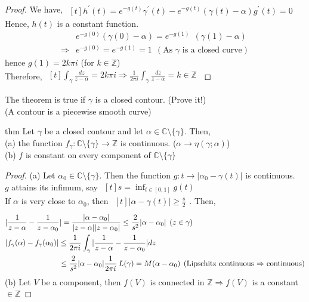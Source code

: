 \begin{proof}
We have, $\begin{aligned}[t] h^{'}(t)=e^{-g(t)}\gamma^{'}(t)-e^{-g(t)}(\gamma(t)-\alpha)g^{'}(t)=0\end{aligned}$\\
Hence, $h(t)$ is a constant function.
\begin{align}
&e^{-g(0)}(\gamma(0)-\alpha)=e^{-g(1)}\:\:(\gamma(1)-\alpha)\nonumber \\
\Rightarrow &e^{-g(0)}=e^{-g(1)}=1 \:\:(\text{As $\gamma$ is a closed curve})\nonumber
\end{align}
hence $g(1)=2k\pi i$ (for $k\in \mathds{Z}$)\\
Therefore, $\begin{aligned}[t] \int_{\gamma}^{}\frac{dz}{z-\alpha}=2k\pi i\Rightarrow \frac{1}{2\pi i}\int_{\gamma}^{}\frac{dz}{z-\alpha}=k\in \mathds{Z} \end{aligned}$ 
\end{proof}
\begin{rem}
The theorem is true if $\gamma$ is a closed contour. (Prove it!) \\(A contour is a piecewise smooth curve)\\
\end{rem}
\begin{restatable}[]{thm}{}\label{}
Let $\gamma$ be a closed contour and let $\alpha \in \mathds{C}\setminus \{\gamma\}$. Then,\\
(a) the function $f_{\gamma}: \mathds{C}\setminus \{\gamma\}\rightarrow \mathds{Z}$ is continuous. ($\alpha \rightarrow \eta(\gamma;\alpha)$)\\
(b) $f$ is constant on every component of $\mathds{C}\setminus \{\gamma\}$
\end{restatable}
\begin{proof}
(a) Let $\alpha_0 \in \mathds{C}\setminus \{\gamma\}$. Then the function $g:t \rightarrow |\alpha_0-\gamma(t)|$ is continuous.\\
$g$ attains its infimum, say $\begin{aligned}[t] s=\inf_{t\in[0,1]} g(t)\end{aligned}$\\
If $\alpha$ is very close to $\alpha_0$, then $\begin{aligned}[t]|\alpha-\gamma(t)|\geq \frac{s}{2}\end{aligned}$. Then,
\begin{align}
&|\frac{1}{z-\alpha}-\frac{1}{z-\alpha_0}|=\frac{|\alpha-\alpha_0|}{|z-\alpha||z-\alpha_0|}\leq \frac{2}{s^2}|\alpha-\alpha_0| \:\:(z\in \gamma)\nonumber\\
&|f_{\gamma}(\alpha)-f_{\gamma}(\alpha_0)|\leq \frac{1}{2\pi i} \int_{\gamma}^{}|\frac{1}{z-\alpha}-\frac{1}{z-\alpha_0}| dz\nonumber\\
&\hspace{25mm}\leq \frac{2}{s^2}|\alpha -\alpha_0|\frac{1}{2\pi i}\:L(\gamma)=M(\alpha-\alpha_0) \:\: (\text{Lipschitz continuous $\Rightarrow$ continuous})\nonumber
\end{align}
(b) Let $V$ be a component, then $f(V)$ is connected in $\mathds{Z}\Rightarrow f(V)$ is a constant $\in \mathds{Z}$
\end{proof}
